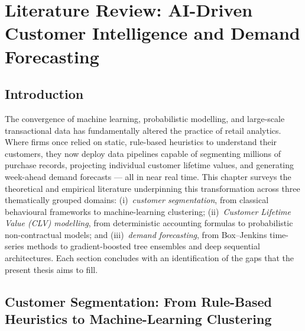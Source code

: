 
\chapter{\textbf{Literature Review: AI-Driven Customer Intelligence and Demand Forecasting}}

\section*{Introduction}

The convergence of machine learning, probabilistic modelling, and large-scale transactional data has fundamentally altered the practice of retail analytics. Where firms once relied on static, rule-based heuristics to understand their customers, they now deploy data pipelines capable of segmenting millions of purchase records, projecting individual customer lifetime values, and generating week-ahead demand forecasts — all in near real time. This chapter surveys the theoretical and empirical literature underpinning this transformation across three thematically grouped domains: (i)~\textit{customer segmentation}, from classical behavioural frameworks to machine-learning clustering; (ii)~\textit{Customer Lifetime Value (CLV) modelling}, from deterministic accounting formulas to probabilistic non-contractual models; and (iii)~\textit{demand forecasting}, from Box--Jenkins time-series methods to gradient-boosted tree ensembles and deep sequential architectures. Each section concludes with an identification of the gaps that the present thesis aims to fill.

\section{Customer Segmentation: From Rule-Based Heuristics to Machine-Learning Clustering}

